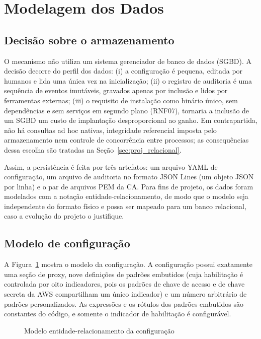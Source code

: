 \section{Modelagem dos Dados}
\label{sec:proj_dados}

\subsection{Decisão sobre o armazenamento}

O mecanismo não utiliza um sistema gerenciador de banco de dados (SGBD). A decisão decorre do perfil dos dados: (i) a configuração é pequena, editada por humanos e lida uma única vez na inicialização; (ii) o registro de auditoria é uma sequência de eventos imutáveis, gravados apenas por inclusão e lidos por ferramentas externas; (iii) o requisito de instalação como binário único, sem dependências e sem serviços em segundo plano (RNF07), tornaria a inclusão de um SGBD um custo de implantação desproporcional ao ganho. Em contrapartida, não há consultas ad hoc nativas, integridade referencial imposta pelo armazenamento nem controle de concorrência entre processos; as consequências dessa escolha são tratadas na Seção~\ref{sec:proj_relacional}.

Assim, a persistência é feita por três artefatos: um arquivo YAML de configuração, um arquivo de auditoria no formato JSON Lines (um objeto JSON por linha) e o par de arquivos PEM da CA. Para fins de projeto, os dados foram modelados com a notação entidade-relacionamento, de modo que o modelo seja independente do formato físico e possa ser mapeado para um banco relacional, caso a evolução do projeto o justifique.

\subsection{Modelo de configuração}

A Figura~\ref{fig:er_cfg} mostra o modelo da configuração. A configuração possui exatamente uma seção de proxy, nove definições de padrões embutidos (cuja habilitação é controlada por oito indicadores, pois os padrões de chave de acesso e de chave secreta da AWS compartilham um único indicador) e um número arbitrário de padrões personalizados. As expressões e os rótulos dos padrões embutidos são constantes do código, e somente o indicador de habilitação é configurável.

\begin{figure}[htb]
\centering
\caption{Modelo entidade-relacionamento da configuração}\label{fig:er_cfg}
\end{figure}

